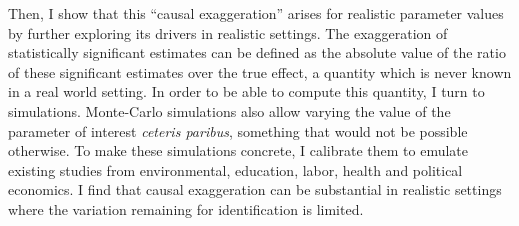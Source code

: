 			 Then, I show that this ``causal exaggeration'' arises for realistic parameter values by further exploring its drivers in realistic settings.
			The exaggeration of statistically significant estimates can be defined as the absolute value of the ratio of these significant estimates over the true effect, a quantity which is never known in a real world setting. In order to be able to compute this quantity, I turn to simulations. Monte-Carlo simulations also allow varying the value of the parameter of interest \textit{ceteris paribus}, something that would not be possible otherwise. To make these simulations concrete, I calibrate them to emulate existing studies from environmental, education, labor, health and political economics. %
			I find that causal exaggeration can be substantial in realistic settings where the variation remaining for identification is limited. 
									
